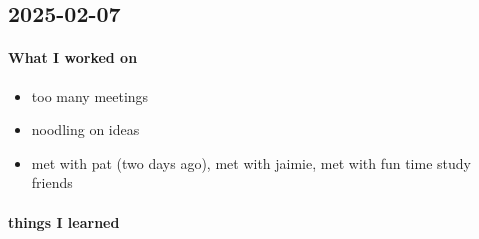 \subsection{2025-02-07}

\paragraph{What I worked on}
\begin{itemize}
    \item too many meetings
    \item noodling on ideas 
    \item met with pat (two days ago), met with jaimie, met with fun time study friends
\end{itemize}

\paragraph{things I learned}
